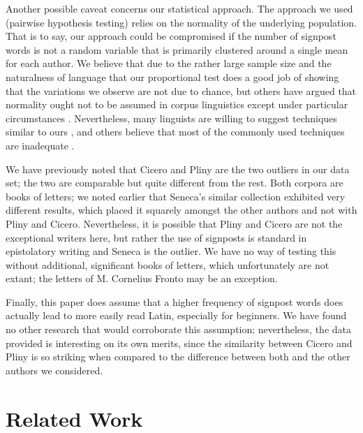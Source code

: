 Another possible caveat concerns our statistical approach. The approach we used (pairwise hypothesis testing) relies on the normality of the underlying population. That is to say, our approach could be compromised if the number of signpost words is not a random variable that is primarily clustered around a single mean for each author. We believe that due to the rather large sample size and the naturalness of language that our proportional test does a good job of showing that the variations we observe are not due to chance, but others have argued that normality ought not to be assumed in corpus linguistics except under particular circumstances \cite{chi2}. Nevertheless, many linguists are willing to suggest techniques similar to ours \cite{gries}, and others believe that most of the commonly used techniques are inadequate \cite{bestgen}.

We have previously noted that Cicero and Pliny are the two outliers in our data set; the two are comparable but quite different from the rest. Both corpora are books of letters; we noted earlier that Seneca's similar collection exhibited very different results, which placed it squarely amongst the other authors and not with Pliny and Cicero. Nevertheless, it is possible that Pliny and Cicero are not the exceptional writers here, but rather the use of signposts is standard in epistolatory writing and Seneca is the outlier. We have no way of testing this without additional, significant books of letters, which unfortunately are not extant; the letters of M. Cornelius Fronto may be an exception.

Finally, this paper does assume that a higher frequency of signpost words does actually lead to more easily read Latin, especially for beginners. We have found no other research that would corroborate this assumption; nevertheless, the data provided is interesting on its own merits, since the similarity between Cicero and Pliny is so striking when compared to the difference between both and the other authors we considered.

\section{Related Work}
\label{sec:related}

